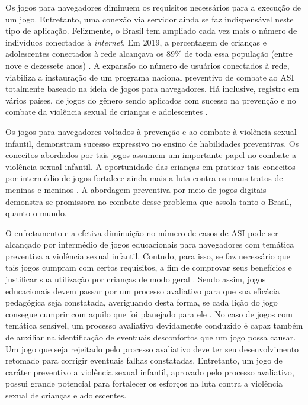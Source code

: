 Os jogos para navegadores diminuem os requisitos necessários para a execução de um jogo. Entretanto, uma conexão via servidor ainda se faz indispensável neste tipo de aplicação. Felizmente, o Brasil tem ampliado cada vez mais o número de indivíduos conectados à \textit{internet}. Em 2019, a percentagem de crianças e adolescentes conectados à rede alcançava os 89\% de toda essa população (entre nove e dezessete anos) \cite{nic2019pesquisa}. A expansão do número de usuários conectados à rede, viabiliza a instauração de um programa nacional preventivo de combate ao \ac{ASI} totalmente baseado na ideia de jogos para navegadores. Há inclusive, registro em vários países, de jogos do gênero sendo aplicados com sucesso na prevenção e no combate da violência sexual de crianças e adolescentes \cite{jones2008online, fingerle2018abschlussbericht}. 

Os jogos para navegadores voltados à prevenção e ao combate à violência sexual infantil, demonstram sucesso expressivo no ensino de habilidades preventivas. Os conceitos abordados por tais jogos assumem um importante papel no combate a violência sexual infantil. A oportunidade das crianças em praticar tais conceitos por intermédio de jogos fortalece ainda mais a luta contra os maus-tratos de meninas e meninos \cite{collin2013lessons}. A abordagem preventiva por meio de jogos digitais demonstra-se promissora no combate desse problema que assola tanto o Brasil, quanto o mundo. 

O enfretamento e a efetiva diminuição no número de casos de \ac{ASI} pode ser alcançado por intermédio de jogos educacionais para navegadores com temática preventiva a violência sexual infantil. Contudo, para isso, se faz necessário que tais jogos cumpram com certos requisitos, a fim de comprovar seus benefícios e justificar sua utilização por crianças de modo geral \cite{campos1996dez}. Sendo assim, jogos educacionais devem passar por um processo avaliativo para que sua eficácia pedagógica seja constatada, averiguando desta forma, se cada lição do jogo consegue cumprir com aquilo que foi planejado para ele \cite{montilva2002method, padron2007towards}. No caso de jogos com temática sensível, um processo avaliativo devidamente conduzido é capaz também de auxiliar na identificação de eventuais desconfortos que um jogo possa causar. Um jogo que seja rejeitado pelo processo avaliativo deve ter seu desenvolvimento retomado para corrigir eventuais falhas constatadas. Entretanto, um jogo de caráter preventivo a violência sexual infantil, aprovado pelo processo avaliativo, possui grande potencial para fortalecer os esforços na luta contra a violência sexual de crianças e adolescentes. 

